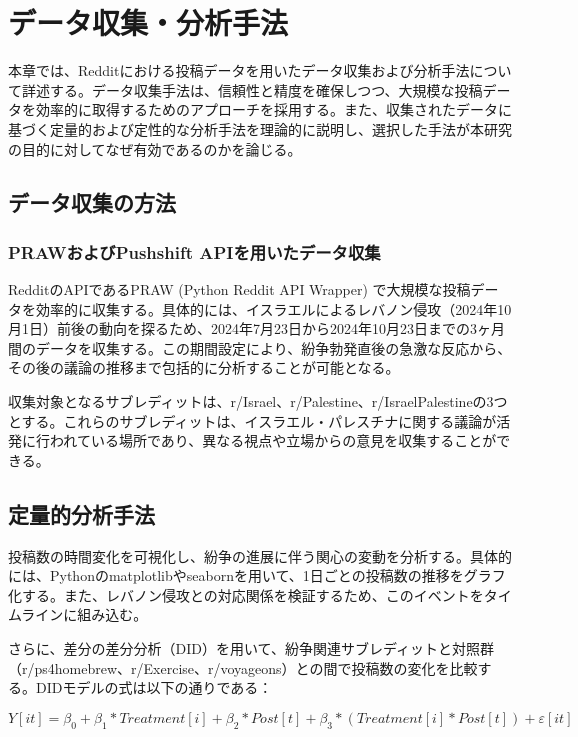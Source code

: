 \documentclass[11pt, a4j]{jreport}
\begin{document}
    \chapter{データ収集・分析手法}
    本章では、Redditにおける投稿データを用いたデータ収集および分析手法について詳述する。データ収集手法は、信頼性と精度を確保しつつ、大規模な投稿データを効率的に取得するためのアプローチを採用する。また、収集されたデータに基づく定量的および定性的な分析手法を理論的に説明し、選択した手法が本研究の目的に対してなぜ有効であるのかを論じる。

    \section{データ収集の方法}
    \subsection{PRAWおよびPushshift APIを用いたデータ収集}
    RedditのAPIであるPRAW (Python Reddit API Wrapper) で大規模な投稿データを効率的に収集する。具体的には、イスラエルによるレバノン侵攻（2024年10月1日）前後の動向を探るため、2024年7月23日から2024年10月23日までの3ヶ月間のデータを収集する。この期間設定により、紛争勃発直後の急激な反応から、その後の議論の推移まで包括的に分析することが可能となる。

    収集対象となるサブレディットは、r/Israel、r/Palestine、r/IsraelPalestineの3つとする。これらのサブレディットは、イスラエル・パレスチナに関する議論が活発に行われている場所であり、異なる視点や立場からの意見を収集することができる。

    \section{定量的分析手法}
    投稿数の時間変化を可視化し、紛争の進展に伴う関心の変動を分析する。具体的には、Pythonのmatplotlibやseabornを用いて、1日ごとの投稿数の推移をグラフ化する。また、レバノン侵攻との対応関係を検証するため、このイベントをタイムラインに組み込む。

    さらに、差分の差分分析（DID）を用いて、紛争関連サブレディットと対照群（r/ps4homebrew、r/Exercise、r/voyageons）との間で投稿数の変化を比較する。DIDモデルの式は以下の通りである：

    \begin{equation}
        Y[it] = β_{0}+ β_{1}* Treatment[i] + β_{2}* Post[t] + β_{3}* (Treatme nt[
        i] * Post[t]) + ε[it]
    \end{equation}
\end{document}
